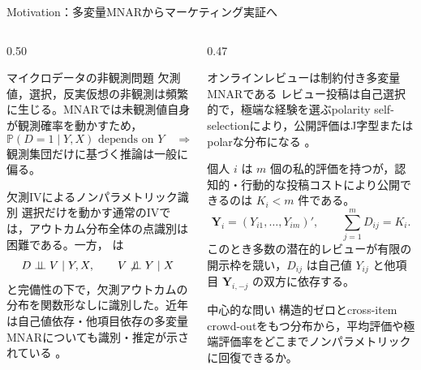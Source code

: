 \documentclass[aspectratio=169,10pt]{beamer}
\newcommand{\Prb}{\mathbb{P}}
\newcommand{\1}{\mathbf{1}}
\newcommand{\indep}{\mathrel{\perp\!\!\!\perp}}
\newcommand{\Y}{\bm{Y}}
\begin{document}
\begin{frame}[shrink=8]{Motivation：多変量MNARからマーケティング実証へ}
\begin{columns}[T,onlytextwidth]
\begin{column}{0.50\textwidth}
\begin{block}{マイクロデータの非観測問題}
\scriptsize
欠測値，選択，反実仮想の非観測は頻繁に生じる。MNARでは未観測値自身が観測確率を動かすため，
\[
\Prb(D=1\mid Y,X)\text{ depends on }Y
\quad\Rightarrow\quad
f(Y\mid D=1,X)\ne f(Y\mid X).
\]
観測集団だけに基づく推論は一般に偏る。
\end{block}
\begin{block}{欠測IVによるノンパラメトリック識別}
\scriptsize
選択だけを動かす通常のIVでは，アウトカム分布全体の点識別は困難である。一方，\textcite{dHaultfoeuille2010} は
\[
D\indep V\mid Y,X,
\qquad V\not\indep Y\mid X
\]
と完備性の下で，欠測アウトカムの分布を関数形なしに識別した。近年は自己値依存・他項目依存の多変量MNARについても識別・推定が示されている
\parencite{LiMiaoShpitserTchetgen2023,MalinskyShpitserTchetgen2022}。
\end{block}
\end{column}
\begin{column}{0.47\textwidth}
\begin{alertblock}{オンラインレビューは制約付き多変量MNARである}
\scriptsize
レビュー投稿は自己選択的で，極端な経験を選ぶpolarity self-selectionにより，公開評価はJ字型またはpolarな分布になる
\parencite{SchoenmuellerNetzerStahl2020,HuPavlouZhang2017}。

\medskip
個人 $i$ は $m$ 個の私的評価を持つが，認知的・行動的な投稿コストにより公開できるのは $K_i<m$ 件である。
\[
\Y_i=(Y_{i1},\ldots,Y_{im})',
\qquad
\sum_{j=1}^{m}D_{ij}=K_i.
\]
このとき多数の潜在的レビューが有限の開示枠を競い，$D_{ij}$ は自己値 $Y_{ij}$ と他項目 $\Y_{i,-j}$ の双方に依存する。
\end{alertblock}
\begin{block}{中心的な問い}
\scriptsize
構造的ゼロとcross-item crowd-outをもつ分布から，平均評価や極端評価率をどこまでノンパラメトリックに回復できるか。
\end{block}
\end{column}
\end{columns}
\end{frame}
\end{document}
